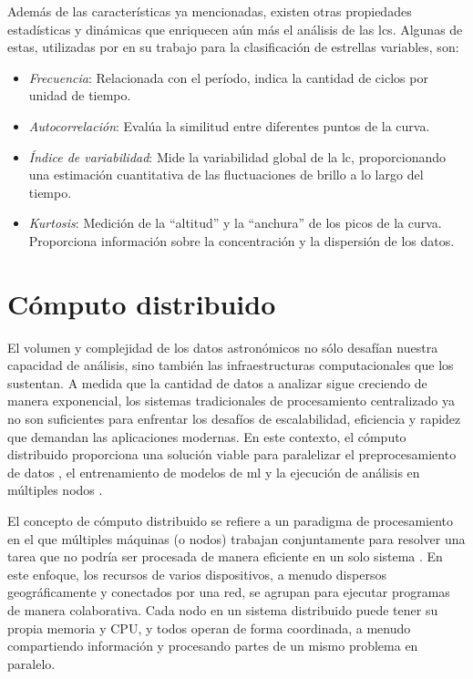 Además de las características ya mencionadas, existen otras propiedades estadísticas y dinámicas que enriquecen aún más el análisis de las \glspl{lc}. Algunas de estas, utilizadas por \citet{richards2011timeseries} en su trabajo para la clasificación de estrellas variables, son:
\begin{itemize}
    \item \emph{Frecuencia}: Relacionada con el período, indica la cantidad de ciclos por unidad de tiempo.
    \item \emph{Autocorrelación}: Evalúa la similitud entre diferentes puntos de la curva.
    \item \emph{Índice de variabilidad}: Mide la variabilidad global de la \gls{lc}, proporcionando una estimación cuantitativa de las fluctuaciones de brillo a lo largo del tiempo.
    \item \emph{Kurtosis}: Medición de la ``altitud'' y la ``anchura'' de los picos de la curva. Proporciona información sobre la concentración y la dispersión de los datos.
\end{itemize}

\section{Cómputo distribuido}

El volumen y complejidad de los datos astronómicos no sólo desafían nuestra capacidad de análisis, sino también las infraestructuras computacionales que los sustentan. A medida que la cantidad de datos a analizar sigue creciendo de manera exponencial, los sistemas tradicionales de procesamiento centralizado ya no son suficientes para enfrentar los desafíos de escalabilidad, eficiencia y rapidez que demandan las aplicaciones modernas. En este contexto, el cómputo distribuido proporciona una solución viable para paralelizar el preprocesamiento de datos \citep{zaharia2016stark}, el entrenamiento de modelos de \gls{ml} \citep{dean2012distributeddeepnetworks} y la ejecución de análisis en múltiples nodos \citep{abadi2016tensorflow}.

El concepto de cómputo distribuido se refiere a un paradigma de procesamiento en el que múltiples máquinas (o nodos) trabajan conjuntamente para resolver una tarea que no podría ser procesada de manera eficiente en un solo sistema \citep{tanenbaum2006distributedsystems, coulouris2011distributedsystems}. En este enfoque, los recursos de varios dispositivos, a menudo dispersos geográficamente y conectados por una red, se agrupan para ejecutar programas de manera colaborativa. Cada nodo en un sistema distribuido puede tener su propia memoria y CPU, y todos operan de forma coordinada, a menudo compartiendo información y procesando partes de un mismo problema en paralelo.

